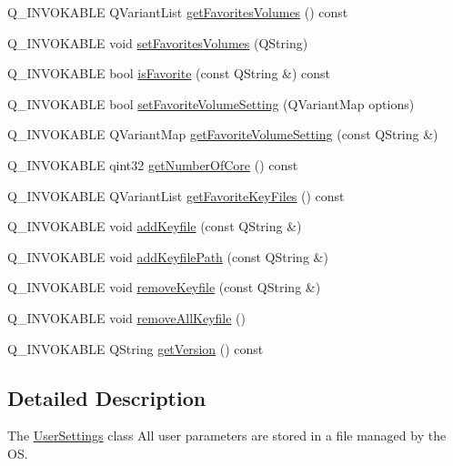 \begin{DoxyCompactItemize}
\item 
Q\+\_\+\+I\+N\+V\+O\+K\+A\+B\+LE Q\+Variant\+List \hyperlink{class_user_settings_a06599c66844e76880b3f8f220662ce4c}{get\+Favorites\+Volumes} () const
\item 
Q\+\_\+\+I\+N\+V\+O\+K\+A\+B\+LE void \hyperlink{class_user_settings_a2041cb2d5b4ec14183f7504a170ee234}{set\+Favorites\+Volumes} (Q\+String)
\item 
Q\+\_\+\+I\+N\+V\+O\+K\+A\+B\+LE bool \hyperlink{class_user_settings_af2853d2437e4bdfc95d7714acf3f4412}{is\+Favorite} (const Q\+String \&) const
\item 
Q\+\_\+\+I\+N\+V\+O\+K\+A\+B\+LE bool \hyperlink{class_user_settings_a622a1a050f24e29663b8c1c8160f334c}{set\+Favorite\+Volume\+Setting} (Q\+Variant\+Map options)
\item 
Q\+\_\+\+I\+N\+V\+O\+K\+A\+B\+LE Q\+Variant\+Map \hyperlink{class_user_settings_ae86ded971587f1e26fe198f0f1b4d176}{get\+Favorite\+Volume\+Setting} (const Q\+String \&)
\item 
Q\+\_\+\+I\+N\+V\+O\+K\+A\+B\+LE qint32 \hyperlink{class_user_settings_a16bb4d9a4366ca2b3196d229147f6c71}{get\+Number\+Of\+Core} () const
\item 
Q\+\_\+\+I\+N\+V\+O\+K\+A\+B\+LE Q\+Variant\+List \hyperlink{class_user_settings_a491eb502b4203b8660c10933edbe8320}{get\+Favorite\+Key\+Files} () const
\item 
Q\+\_\+\+I\+N\+V\+O\+K\+A\+B\+LE void \hyperlink{class_user_settings_ae4235bad48b9b2f0549b9678cfd74353}{add\+Keyfile} (const Q\+String \&)
\item 
Q\+\_\+\+I\+N\+V\+O\+K\+A\+B\+LE void \hyperlink{class_user_settings_a2778eefdc06a1711398c0d19c9e108e1}{add\+Keyfile\+Path} (const Q\+String \&)
\item 
Q\+\_\+\+I\+N\+V\+O\+K\+A\+B\+LE void \hyperlink{class_user_settings_aca7047180ee2b733fa6ba0578cbb7a1a}{remove\+Keyfile} (const Q\+String \&)
\item 
Q\+\_\+\+I\+N\+V\+O\+K\+A\+B\+LE void \hyperlink{class_user_settings_adb2b7ecfdda9d2ea1c017a0696dcbb16}{remove\+All\+Keyfile} ()
\item 
Q\+\_\+\+I\+N\+V\+O\+K\+A\+B\+LE Q\+String \hyperlink{class_user_settings_acf4e409e75947f7002872e296bed933b}{get\+Version} () const
\end{DoxyCompactItemize}


\subsection{Detailed Description}
The \hyperlink{class_user_settings}{User\+Settings} class All user parameters are stored in a file managed by the OS. 


